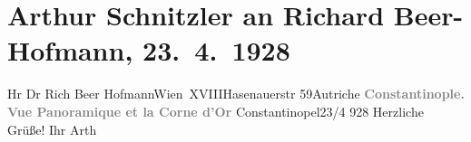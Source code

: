 

         
         \renewcommand{\erwaehntePersonen}{Personen: Richard Beer-Hofmann}
         \renewcommand{\erwaehnteOrte}{Orte: Goldenes Horn, Hasenauerstraße, Istanbul, Wien, XVIII., Währing, Österreich}
         \renewcommand{\erwaehnteWerke}{}
               \section[Arthur Schnitzler an Richard Beer-Hofmann, 23. 4. 1928]{ Arthur Schnitzler an Richard Beer-Hofmann, 23. 4. 1928}\nopagebreak{}\rehead{ }\begin{ledgroupsized}[t]{13cm}\normalsize\beginnumbering{} \toendnotes[C]{\smallbreak\pagebreak[2]} 
\pstart{}{\pb}Hr Dr Rich Beer Hofmann\pend{}\pstart{}Wien XVIII\pend{}\pstart{}Hasenauerstr 59\pend{}\pstart{}Autriche\pend{}{\bigskip}\pstart
           \noindent{}\centering{}{\pb}\textcolor{gray}{\textbf{Constantinople. Vue Panoramique et la Corne d’Or}}\pend
           \pstart
           \raggedleft{}{\pb}Constantinopel23/4 928\pend
           \pstart
           Herzliche Grüße!\pend
           \pstart Ihr \spacefill\mbox{Arth}\pend{}
         
         \endnumbering{}\end{ledgroupsized}  \newcommand{\dateiname}{L02499}\newcommand{\titel}{Arthur Schnitzler an Richard Beer-Hofmann, 23. 4. 1928}\newcommand{\editorInnen}{Martin Anton Müller und Gerd-Hermann Susen}
      